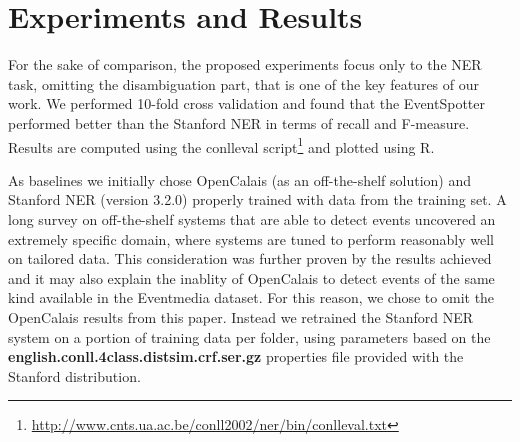 \documentclass[10pt,a4paper]{article}
\begin{document}
\section{Experiments and Results}
For the sake of comparison, the proposed experiments focus only to the NER task, omitting the disambiguation part, that is one of the key features of our work. We performed 10-fold cross validation and found that the EventSpotter performed better than the Stanford NER in terms of recall and F-measure. Results are computed using the conlleval script\footnote{\url{http://www.cnts.ua.ac.be/conll2002/ner/bin/conlleval.txt}} and plotted using R.

As baselines we initially chose OpenCalais (as an off-the-shelf solution) and Stanford NER (version 3.2.0) properly trained with data from the training set. 
A long survey on off-the-shelf systems that are able to detect events uncovered an extremely specific domain, where systems are tuned to perform reasonably well on tailored data. This consideration was further proven by the results achieved and it may also explain the inablity of OpenCalais to detect events of the same kind available in the Eventmedia dataset. For this reason, we chose to omit the OpenCalais results from this paper.
Instead we retrained the Stanford NER system on a portion of training data per folder, using parameters based on the \textbf{english.conll.4class.distsim.crf.ser.gz} properties file provided with the Stanford distribution.
\end{document}
